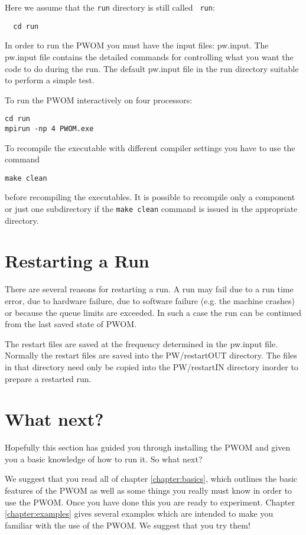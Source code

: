 Here we assume that the {\tt run} directory is still called {\tt
run}:
\begin{verbatim}
  cd run
\end{verbatim}
In order to run the PWOM you must have the input files: 
pw.input. The pw.input 
file contains the detailed commands for controlling what you want the
code to do during the run.  The default pw.input 
file in the run directory  suitable to perform a simple test.

To run the PWOM interactively on four processors:
\begin{verbatim}
cd run
mpirun -np 4 PWOM.exe
\end{verbatim}

To recompile the executable with different compiler settings you have
to use the command
\begin{verbatim}
make clean
\end{verbatim}
before recompiling the executables. It is possible to recompile
only a component or just one subdirectory if the {\tt make clean}
command is issued in the appropriate directory.

\section{Restarting a Run}

There are several reasons for restarting a run. A run may fail
due to a run time error, due to hardware failure, due to 
software failure (e.g. the machine crashes) or because the
queue limits are exceeded. In such a case the run can be continued from
the last saved state of PWOM. 

The restart files are saved at the frequency determined in the pw.input file.
Normally the restart files are saved into the PW/restartOUT directory. 
The files in that directory need only be copied into the PW/restartIN 
directory inorder to prepare a restarted run.

\section{What next?}

Hopefully this section has guided you through installing the PWOM and
given you a basic knowledge of how to run it.  So what next?

We suggest that you read all of chapter \ref{chapter:basics}, which
outlines the basic features of the PWOM as well as some things you
really must know in order to use the PWOM.  Once you have done this you
are ready to experiment.  Chapter \ref{chapter:examples} gives several 
examples which are intended to make you familiar with the use of the
PWOM.  We suggest that you try them!

%
